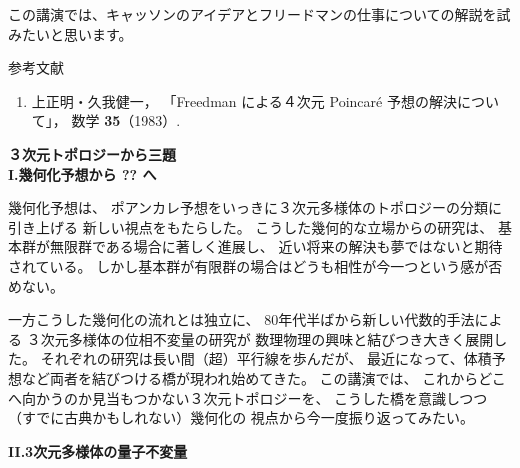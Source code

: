 \documentclass[uplatex,dvipdfmx]{jlreq}
\begin{document}
この講演では、キャッソンのアイデアとフリードマンの仕事についての解説を試みたいと思います。

\vspace{1pc}

\begin{center}
  \textsc{参考文献}
\end{center}
\begin{enumerate}
  \item[{[1]}] 上正明・久我健一，
        「Freedman による４次元 Poincaré 予想の解決について」，
        数学 \textbf{35}（1983）.
\end{enumerate}

\newpage

\begin{center}
  {\Large\bfseries ３次元トポロジーから三題}\\[2pc]
  {\large\bfseries I.\quad 幾何化予想から ?? へ}
\end{center}

\bigskip
\hspace*{\fill}{\large\bfseries 小島　定吉（東工大・情報理工）}

\bigskip

幾何化予想は、
ポアンカレ予想をいっきに３次元多様体のトポロジーの分類に引き上げる
新しい視点をもたらした。
こうした幾何的な立場からの研究は、
基本群が無限群である場合に著しく進展し、
近い将来の解決も夢ではないと期待されている。
しかし基本群が有限群の場合はどうも相性が今一つという感が否めない。

一方こうした幾何化の流れとは独立に、
80年代半ばから新しい代数的手法による
３次元多様体の位相不変量の研究が
数理物理の興味と結びつき大きく展開した。
それぞれの研究は長い間（超）平行線を歩んだが、
最近になって、体積予想など両者を結びつける橋が現われ始めてきた。
この講演では、
これからどこへ向かうのか見当もつかない３次元トポロジーを、
こうした橋を意識しつつ（すでに古典かもしれない）幾何化の
視点から今一度振り返ってみたい。

\newpage

\begin{center}
  {\large\bfseries II.\quad 3次元多様体の量子不変量}
\end{center}
\end{document}
